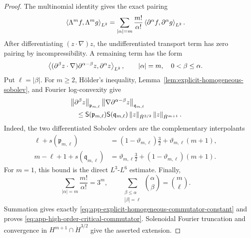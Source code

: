 \begin{proof}
The multinomial identity gives the exact pairing
\[
 \left\langle \Lambda^mf,\Lambda^mg\right\rangle_{L^2}
 =
 \sum_{|\alpha|=m}\frac{m!}{\alpha!}
 \left\langle \partial^\alpha f,\partial^\alpha g\right\rangle_{L^2}.
\]
After differentiating \((z\cdot\nabla)z\), the undifferentiated transport
term has zero pairing by incompressibility.  A remaining term has the form
\[
 \left\langle (\partial^\beta z\cdot\nabla)
          \partial^{\alpha-\beta}z,\partial^\alpha z\right\rangle_{L^2},
 \qquad
 |\alpha|=m,\quad 0<\beta\le\alpha.
\]
Put \(\ell=|\beta|\).  For \(m\ge2\), H\"older's inequality,
Lemma~\ref{lem:explicit-homogeneous-sobolev}, and Fourier log-convexity give
\begin{align*}
 &\left\lVert \partial^\beta z\right\rVert_{\mathfrak p_{m,\ell}}
 \left\lVert \nabla\partial^{\alpha-\beta}z\right\rVert_{\mathfrak q_{m,\ell}}\\
 &\quad\le
 \mathsf S(\mathfrak p_{m,\ell})
 \mathsf S(\mathfrak q_{m,\ell})
 \left\lVert z\right\rVert_{\dot H^{3/2}}\left\lVert z\right\rVert_{\dot H^{m+1}}.
\end{align*}
Indeed, the two differentiated Sobolev orders are the complementary
interpolants
\begin{align*}
 \ell+s(\mathfrak p_{m,\ell})
 &=(1-\vartheta_{m,\ell})\frac32
   +\vartheta_{m,\ell}(m+1),\\
 m-\ell+1+s(\mathfrak q_{m,\ell})
 &=\vartheta_{m,\ell}\frac32
   +(1-\vartheta_{m,\ell})(m+1).
\end{align*}
For \(m=1\), this bound is the direct \(L^3\)-\(L^6\) estimate.
Finally,
\[
 \sum_{|\alpha|=m}\frac{m!}{\alpha!}=3^m,
 \qquad
 \sum_{\substack{\beta\le\alpha\\|\beta|=\ell}}
 \binom\alpha\beta=\binom m\ell.
\]
Summation gives exactly
\eqref{eq:app-explicit-homogeneous-commutator-constant} and proves
\eqref{eq:app-high-order-critical-commutator}.
Solenoidal Fourier truncation and convergence in
\(H^{m+1}\cap\dot H^{3/2}\) give the asserted extension.
\end{proof}

